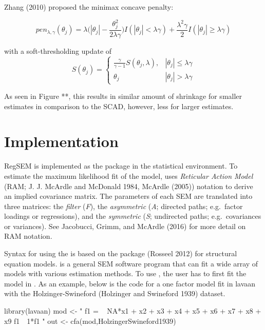 \documentclass[article]{jss}
\begin{document}
Zhang (2010) proposed the minimax concave penalty:

\[
pen_{\lambda,\gamma}(\theta_{j}) = \lambda\bigg(|\theta_{j}|-\frac{\theta_{j}^{2}}{2\lambda\gamma}\bigg)I(|\theta_{j}|<\lambda\gamma) +\frac{\lambda^{2}\gamma}{2}I(|\theta_{j}|\geq \lambda\gamma)
\]

\noindent
with a soft-thresholding update of \[
S(\theta_{j})= 
\begin{cases}
\frac{\gamma}{\gamma-1}S(\theta_{j},\lambda),&  |\theta_{j}| \leq \lambda\gamma\\
\theta_{j} & |\theta_{j}| > \lambda \gamma
\end{cases}
\]

\noindent
As seen in Figure **, this results in similar amount of shrinkage for
smaller estimates in comparison to the SCAD, however, less for larger
estimates.

\section{Implementation}\label{implementation}

RegSEM is implemented as the  package in the 
statistical environment. To estimate the maximum likelihood fit of the
model,  uses \textit{Reticular Action Model} (RAM; J. J.
McArdle and McDonald 1984, McArdle (2005)) notation to derive an implied
covariance matrix. The parameters of each SEM are translated into three
matrices: the \textit{filter} (\textit{F}), the \textit{asymmetric}
(\textit{A}; directed paths; e.g.~factor loadings or regressions), and
the \textit{symmetric} (\textit{S}; undirected paths; e.g.~covariances
or variances). See Jacobucci, Grimm, and McArdle (2016) for more detail
on RAM notation.

Syntax for using the  is based on the  package
(Rosseel 2012) for structural equation models.  is a general
SEM software program that can fit a wide array of models with various
estimation methods. To use , the user has to first fit the
model in . As an example, below is the code for a one factor
model fit in lavaan with the Holzinger-Swineford (Holzinger and
Swineford 1939) dataset.

\begin{CodeChunk}
\begin{CodeInput}
library(lavaan)
mod <- "
f1 = ~ NA*x1 + x2 + x3 + x4 + x5 + x6 + x7 + x8 + x9
f1~~1*f1
"
out <- cfa(mod,HolzingerSwineford1939)
\end{CodeInput}
\end{CodeChunk}
\end{document}
